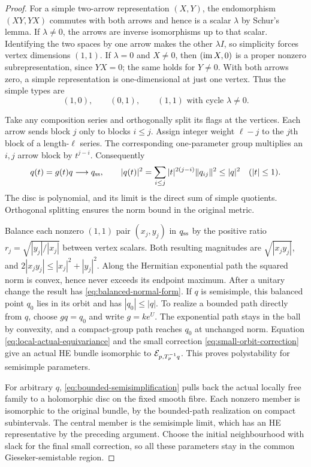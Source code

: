 \begin{proof}
For a simple two-arrow representation $(X,Y)$, the
endomorphism $(XY,YX)$ commutes with both arrows and
hence is a scalar $\lambda$ by Schur's lemma. If
$\lambda\ne0$, the arrows are inverse isomorphisms up
to that scalar. Identifying the two spaces by one arrow
makes the other $\lambda I$, so simplicity forces
vertex dimensions $(1,1)$. If $\lambda=0$ and $X\ne0$,
then $(\operatorname{im} X,0)$ is a proper nonzero subrepresentation,
since $YX=0$; the same holds for $Y\ne0$. With both
arrows zero, a simple representation is one-dimensional
at just one vertex. Thus the simple types are
\[
 (1,0),\qquad(0,1),\qquad(1,1)\text{ with cycle }\lambda\ne0.
\]

Take any composition series and orthogonally split its
flags at the vertices. Each arrow sends block $j$ only
to blocks $i\le j$. Assign integer weight $\ell-j$ to
the $j$th block of a length-$\ell$ series.
The corresponding one-parameter group multiplies an
$i,j$ arrow block by $t^{j-i}$. Consequently
\begin{equation}\label{eq:bounded-semisimplification}
 q(t)=g(t)q\longrightarrow q_{\rm ss},\qquad
 |q(t)|^2=\sum_{i\le j}|t|^{2(j-i)}\|q_{ij}\|^2
                   \le|q|^2\quad(|t|\le1).
\end{equation}
The disc is polynomial, and its limit is the direct
sum of simple quotients. Orthogonal splitting ensures
the norm bound in the original metric.

Balance each nonzero $(1,1)$ pair $(x_j,y_j)$ in
$q_{\rm ss}$ by the positive ratio
$r_j=\sqrt{|y_j|/|x_j|}$ between vertex scalars.
Both resulting magnitudes are $\sqrt{|x_jy_j|}$, and
$2|x_jy_j|\le|x_j|^2+|y_j|^2$.
Along the Hermitian exponential path the squared norm
is convex, hence never exceeds its endpoint maximum.
After a unitary change the result has
\eqref{eq:balanced-normal-form}. If $q$ is semisimple,
this balanced point $q_0$ lies in its orbit and has
$|q_0|\le|q|$. To realize a bounded path directly from
$q$, choose $gq=q_0$ and write $g=ke^U$.
The exponential path stays in the ball by convexity,
and a compact-group path reaches $q_0$ at unchanged
norm. Equation \eqref{eq:local-actual-equivariance}
and the small correction
\eqref{eq:small-orbit-correction} give an actual HE
bundle isomorphic to $\mathcal E_{p,T_p^{-1}q}$.
This proves polystability for semisimple parameters.

For arbitrary $q$, \eqref{eq:bounded-semisimplification}
pulls back the actual locally free family to a
holomorphic disc on the fixed smooth fibre. Each
nonzero member is isomorphic to the original bundle,
by the bounded-path realization on compact subintervals.
The central member is the semisimple limit, which has
an HE representative by the preceding argument.
Choose the initial neighbourhood with slack for the
final small correction, so all these parameters stay
in the common Gieseker-semistable region.


\end{proof}

